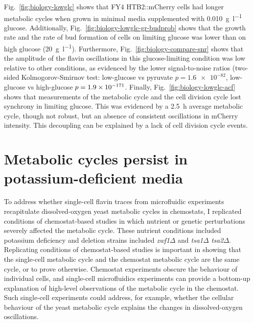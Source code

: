 Fig.\ \ref{fig:biology-lowglc} shows that FY4 HTB2::mCherry cells had longer metabolic cycles when grown in minimal media supplemented with \SI{0.010}{\gram~\litre^{-1}} glucose.
Additionally, Fig.\ \ref{fig:biology-lowglc-gr-budprob} shows that the growth rate and the rate of bud formation of cells on limiting glucose was lower than on high glucose (\SI{20}{\gram~\litre^{-1}}).
Furthermore, Fig.\ \ref{fig:biology-compare-snr} shows that the amplitude of the flavin oscillations in this glucose-limiting condition was low relative to other conditions, as evidenced by the lower signal-to-noise ratios (two-sided Kolmogorov-Smirnov test: low-glucose vs pyruvate $p = \num{1.6e-82}$, low-glucose vs high-glucose $p = \num{1.9d-171}$.
Finally, Fig.\ \ref{fig:biology-lowglc-acf} shows that measurements of the metabolic cycle and the cell division cycle lost synchrony in limiting glucose.
This was evidenced by a \SI{2.5}{\hour} average metabolic cycle, though not robust, but an absence of consistent oscillations in mCherry intensity.
This decoupling can be explained by a lack of cell division cycle events.




\section{Metabolic cycles persist in potassium-deficient media}
\label{sec:biology-potassium_deficient}

To address whether single-cell flavin traces from microfluidic experiments recapitulate dissolved-oxygen yeast metabolic cycles in chemostats, I replicated conditions of chemostat-based studies in which nutrient or genetic perturbations severely affected the metabolic cycle.
These nutrient conditions included potassium deficiency and deletion strains included \textit{zwf1$\Delta$} and \textit{tsa1$\Delta$ tsa2$\Delta$}.
Replicating conditions of chemostat-based studies is important in showing that the single-cell metabolic cycle and the chemostat metabolic cycle are the same cycle, or to prove otherwise.
Chemostat experiments obscure the behaviour of individual cells, and single-cell microfluidics experiments can provide a bottom-up explanation of high-level observations of the metabolic cycle in the chemostat. Such single-cell experiments could address, for example, whether the cellular behaviour of the yeast metabolic cycle explains the changes in dissolved-oxygen oscillations.

